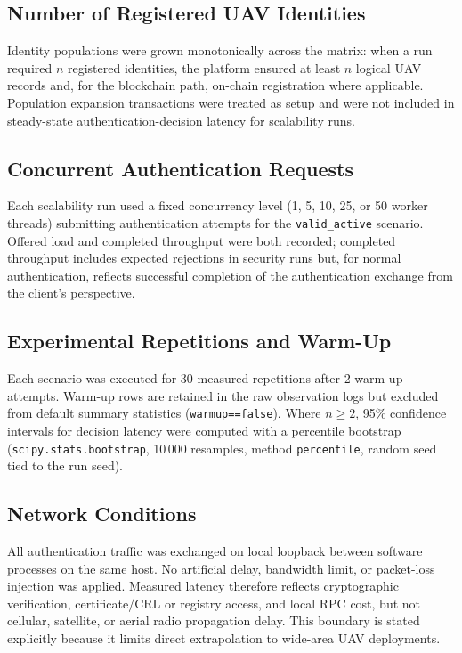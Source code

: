 \subsection{Number of Registered UAV Identities}
\label{sec:ch5-identities}

Identity populations were grown monotonically across the matrix: when a run required $n$ registered identities, the platform ensured at least $n$ logical UAV records and, for the blockchain path, on-chain registration where applicable. Population expansion transactions were treated as setup and were not included in steady-state authentication-decision latency for scalability runs.

\subsection{Concurrent Authentication Requests}
\label{sec:ch5-concurrency}

Each scalability run used a fixed concurrency level (1, 5, 10, 25, or 50 worker threads) submitting authentication attempts for the \texttt{valid\_active} scenario. Offered load and completed throughput were both recorded; completed throughput includes expected rejections in security runs but, for normal authentication, reflects successful completion of the authentication exchange from the client's perspective.

\subsection{Experimental Repetitions and Warm-Up}
\label{sec:ch5-repetitions}

Each scenario was executed for 30 measured repetitions after 2 warm-up attempts. Warm-up rows are retained in the raw observation logs but excluded from default summary statistics (\texttt{warmup==false}). Where $n \geq 2$, 95\% confidence intervals for decision latency were computed with a percentile bootstrap (\texttt{scipy.stats.bootstrap}, 10\,000 resamples, method \texttt{percentile}, random seed tied to the run seed).

\subsection{Network Conditions}
\label{sec:ch5-network}

All authentication traffic was exchanged on local loopback between software processes on the same host. No artificial delay, bandwidth limit, or packet-loss injection was applied. Measured latency therefore reflects cryptographic verification, certificate/CRL or registry access, and local RPC cost, but not cellular, satellite, or aerial radio propagation delay. This boundary is stated explicitly because it limits direct extrapolation to wide-area UAV deployments.
